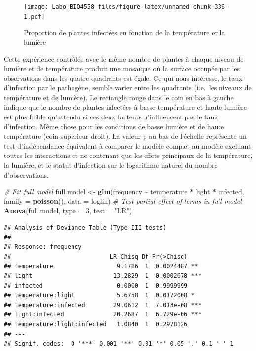 \documentclass[
  12pt,
]{book}
\newenvironment{Shaded}{\begin{snugshade}}{\end{snugshade}}
\newcommand{\CommentTok}[1]{\textcolor[rgb]{0.56,0.35,0.01}{\textit{#1}}}
\newcommand{\DataTypeTok}[1]{\textcolor[rgb]{0.13,0.29,0.53}{#1}}
\newcommand{\DecValTok}[1]{\textcolor[rgb]{0.00,0.00,0.81}{#1}}
\newcommand{\KeywordTok}[1]{\textcolor[rgb]{0.13,0.29,0.53}{\textbf{#1}}}
\newcommand{\NormalTok}[1]{#1}
\newcommand{\OperatorTok}[1]{\textcolor[rgb]{0.81,0.36,0.00}{\textbf{#1}}}
\newcommand{\StringTok}[1]{\textcolor[rgb]{0.31,0.60,0.02}{#1}}
\begin{document}
\begin{figure}
\centering
\texttt{[image: Labo\_BIO4558\_files/figure-latex/unnamed-chunk-336-1.pdf]}
\caption{\label{fig:unnamed-chunk-336}Proportion de plantes infectées en fonction de la température er la lumière}
\end{figure}

Cette expérience contrôlée avec le même nombre de plantes à chaque niveau de lumière et de température produit une mosaïque où la surface occupée par les observations dans les quatre quadrants est égale. Ce qui nous intéresse, le taux d'infection par le pathogène, semble varier entre les quadrants (i.e.~les niveaux de température et de lumière). Le rectangle rouge dans le coin en bas à gauche indique que le nombre de plantes infectées à basse température et haute lumière est plus faible qu'attendu si ces deux facteurs n'influencent pas le taux d'infection. Même chose pour les conditions de basse lumière et de haute température (coin supérieur droit). La valeur p au bas de l'échelle représente un test d'indépendance équivalent à comparer le modèle complet au modèle excluant toutes les interactions et ne contenant que les effets principaux de la température, la lumière, et le statut d'infection sur le logarithme naturel du nombre d'observations.

\begin{Shaded}
\begin{Highlighting}[]
\CommentTok{\# Fit full model}
\NormalTok{full.model \textless{}{-}}\StringTok{ }\KeywordTok{glm}\NormalTok{(frequency }\OperatorTok{\textasciitilde{}}\StringTok{ }\NormalTok{temperature }\OperatorTok{*}\StringTok{ }\NormalTok{light }\OperatorTok{*}\StringTok{ }\NormalTok{infected, }\DataTypeTok{family =} \KeywordTok{poisson}\NormalTok{(), }\DataTypeTok{data =}\NormalTok{ loglin)}
\CommentTok{\# Test partial effect of terms in full model}
\KeywordTok{Anova}\NormalTok{(full.model, }\DataTypeTok{type =} \DecValTok{3}\NormalTok{, }\DataTypeTok{test =} \StringTok{"LR"}\NormalTok{)}
\end{Highlighting}
\end{Shaded}

\begin{verbatim}
## Analysis of Deviance Table (Type III tests)
## 
## Response: frequency
##                            LR Chisq Df Pr(>Chisq)    
## temperature                  9.1786  1  0.0024487 ** 
## light                       13.2829  1  0.0002678 ***
## infected                     0.0000  1  0.9999999    
## temperature:light            5.6758  1  0.0172008 *  
## temperature:infected        29.0612  1  7.013e-08 ***
## light:infected              20.2687  1  6.729e-06 ***
## temperature:light:infected   1.0840  1  0.2978126    
## ---
## Signif. codes:  0 '***' 0.001 '**' 0.01 '*' 0.05 '.' 0.1 ' ' 1
\end{verbatim}
\end{document}
